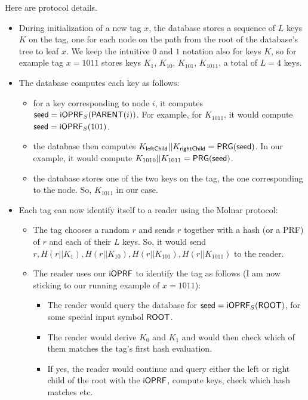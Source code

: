 \documentclass{article}
\begin{document}
Here are protocol details.
\begin{itemize}

\item During initialization of a new tag $x$, the database stores a
  sequence of $L$ keys $K$ on the tag, one for each node on the path from
  the root of the database's tree to leaf $x$. We keep the intuitive $0$
  and $1$ notation also for keys $K$, so for example tag $x = 1011$ stores
  keys $K_1$, $K_{10}$, $K_{101}$, $K_{1011}$, a total of $L=4$ keys.

\item The database computes each key as follows:  
\begin{itemize}
\item for a key corresponding to node $i$, it computes $\mathsf{seed} =
  \mathsf{i}\mathsf{OPRF}_S(\mathsf{PARENT}(i))$. For example, for $K_{1011}$, it would
  compute $\mathsf{seed} = \mathsf{i}\mathsf{OPRF}_S(101)$.

\item the database then computes
  $K_{\mathsf{leftChild}}||K_{\mathsf{rightChild}} = \mathsf{PRG}(\mathsf{seed})$. In
  our example, it would compute $K_{1010}||K_{1011} = \mathsf{PRG}(\mathsf{seed})$.

\item the database stores one of the two keys on the tag, the one corresponding to the node. So, $K_{1011}$ in our case.
\end{itemize}

\item Each tag can now identify itself to a reader using the Molnar protocol:

  \begin{itemize}
\item The tag chooses a random $r$ and sends $r$ together with a hash (or a PRF) of $r$ and each of their $L$ keys. So, it would send $r, H(r||K_1), H(r||K_{10}), H(r||K_{101}), H(r||K_{1011})$ to the reader.

\item The reader uses our $\mathsf{i}\mathsf{OPRF}$ to identify the tag as follows (I am now sticking to our running example of $x=1011$):
  \begin{itemize}
    
\item The reader would query the database for $\mathsf{seed} =
  \mathsf{i}\mathsf{OPRF}_S(\mathsf{ROOT})$, for some special input symbol $\mathsf{ROOT}$.

\item The reader would derive $K_0$ and $K_1$ and would then check which of them matches the tag's first hash evaluation. 

\item If yes, the reader would continue and query either the left or right child of the root with the $\mathsf{i}\mathsf{OPRF}$, compute keys, check which hash matches etc.
\end{itemize}
  \end{itemize}
\end{itemize}
\end{document}
